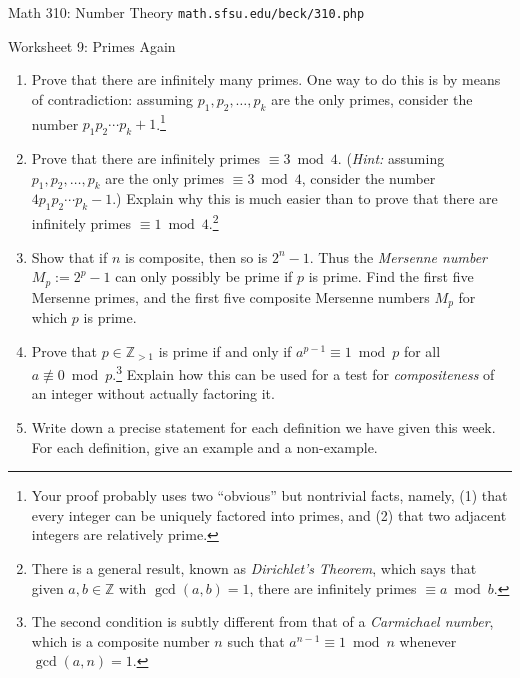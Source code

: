 \documentclass[11pt]{article}
\def\Z{\mathbb{Z}}
\begin{document}
\setlength{\parindent}{0pt}
\setlength{\parskip}{0.2cm}

{ Math 310: Number Theory}
\hfill
{\tt math.sfsu.edu/beck/310.php}

\vspace{.3in}

\begin{center}
\Large{Worksheet 9: Primes Again}
\end{center}

\begin{enumerate}

\item Prove that there are infinitely many primes.
One way to do this is by means of contradiction: assuming $p_1, p_2, \dots, p_k$ are the only primes,
consider the number $p_1 p_2 \cdots p_k + 1$.\footnote{
Your proof probably uses two ``obvious'' but nontrivial facts, namely, (1) that every integer can be uniquely
factored into primes, and (2) that two adjacent integers are relatively prime.
}

\item Prove that there are infinitely primes $\equiv 3 \bmod 4$.
(\emph{Hint:} assuming $p_1, p_2, \dots, p_k$ are the only primes $\equiv 3 \bmod 4$, consider the number $4 p_1 p_2 \cdots p_k - 1$.)
Explain why this is much easier than to prove that there are infinitely primes $\equiv 1 \bmod 4$.\footnote{
There is a general result, known as \emph{Dirichlet's Theorem}, which says that given $a,b \in \Z$ with $\gcd(a,b) = 1$, there are infinitely primes $\equiv a \bmod b$.
}

\item Show that if $n$ is composite, then so is $2^n - 1$.
Thus the \emph{Mersenne number} $M_p := 2^p - 1$ can only possibly be prime if $p$ is prime.
Find the first five Mersenne primes, and the first five composite Mersenne numbers $M_p$ for which $p$ is
prime.

\item Prove that $p \in \Z_{ >1 }$ is prime if and only if $a^{ p-1 } \equiv 1 \bmod p$ for all $a
\not\equiv 0 \bmod p$.\footnote{
The second condition is subtly different from that of a \emph{Carmichael number}, which is a composite number $n$ such that $a^{ n-1 } \equiv 1 \bmod n$ whenever $\gcd(a,n) = 1$.
}
Explain how this can be used for a test for \emph{compositeness} of an integer without actually factoring
it.
 
 
\item Write down a precise statement for each definition we have given this week.
For each definition, give an example and a non-example.

\end{enumerate}
\end{document}
